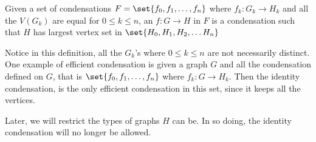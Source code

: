 \begin{definition}
  Given a set of condensations \(F = \set{f_0, f_1, \ldots, f_n}\)
  where \(f_k: G_k \to H_k\)
  and all the \(V(G_k)\) are equal for \(0 \leq k \leq n\),
  an  \(f: G \to H\) in \(F\)
  is a condensation such that
  \(H\) has largest vertex set in
  \(\set{H_0, H_1, H_2, \ldots H_n}\)
\end{definition}

Notice in this definition,
all the \(G_k\)'s where \(0 \leq k \leq n\) are not
necessarily distinct.
One example of efficient condensation is
given a graph \(G\) and all the condensation defined on \(G\),
that is  \(\set{f_0, f_1, \ldots, f_n}\) where \(f_k: G \to H_k\).
Then the identity condensation,
is the only efficient condensation in this set,
since it keeps all the vertices.

Later, we will restrict the types of graphs \(H\) can be.
In so doing, the identity condensation will no longer be allowed.
